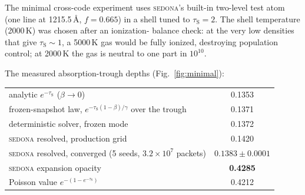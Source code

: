 \documentclass[fleqn,usenatbib]{mnras}
\newcommand{\taus}{\tau_{\mathrm{S}}}
\begin{document}
The minimal cross-code experiment uses \textsc{sedona}'s built-in two-level
test atom (one line at 1215.5\,\AA, $f=0.665$) in a shell tuned to
$\taus=2$. The shell temperature (2000\,K) was chosen after an ionization-
balance check: at the very low densities that give $\taus\sim1$, a 5000\,K
gas would be fully ionized, destroying population control; at 2000\,K the
gas is neutral to one part in $10^{10}$.

The measured absorption-trough depths (Fig.~\ref{fig:minimal}):
\begin{table}
\centering
\small
\begin{tabular}{@{}lc@{}}
\toprule
analytic $e^{-\taus}$ ($\beta\to0$) & 0.1353 \\
frozen-snapshot law, $e^{-\taus(1-\beta)/\gamma}$ over the trough & 0.1371 \\
deterministic solver, frozen mode & 0.1372 \\
\textsc{sedona} resolved, production grid & 0.1420 \\
\textsc{sedona} resolved, converged (5 seeds, $3.2\times10^7$ packets) & $0.1383\pm0.0001$ \\
\textsc{sedona} expansion opacity & \textbf{0.4285} \\
Poisson value $e^{-(1-e^{-\taus})}$ & 0.4212 \\
\bottomrule
\end{tabular}
\end{table}
\end{document}
